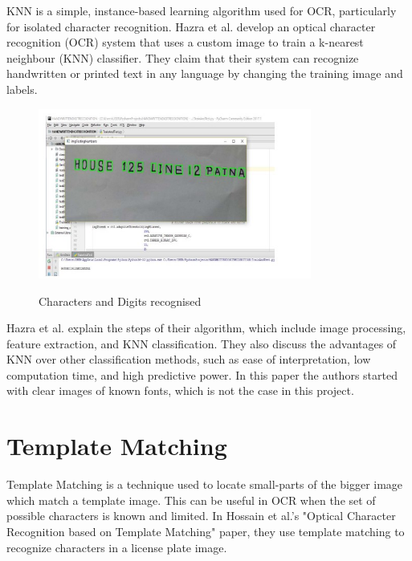 KNN is a simple, instance-based learning algorithm used for OCR, particularly for isolated character recognition. Hazra et al. develop an optical character recognition (OCR) system that uses a custom image to train a k-nearest neighbour (KNN) classifier. They claim that their system can recognize handwritten or printed text in any language by changing the training image and labels. \cite{hazraOpticalCharacterRecognition2017}

\begin{figure}[!h]
    \centering
    \includegraphics[width=0.8\textwidth]{Figures/KNN_Hazra.jpg}
    \caption[Optical Character Recognition using KNN on Custom
        Image Dataset]{Characters and Digits recognised}\cite{joshuaDevelopmentImageProcessing2023}
    \label{fig:Hazra OCR KNN Paper}
\end{figure}

Hazra et al. explain the steps of their algorithm, which include image processing, feature extraction, and KNN classification. They also discuss the advantages of KNN over other classification methods, such as ease of interpretation, low computation time, and high predictive power. In this paper the authors started with clear images of known fonts, which is not the case in this project.


\newpage

\section{Template Matching}

Template Matching is a technique used to locate small-parts of the bigger image which match a template image. This can be useful in OCR when the set of possible characters is known and limited. In Hossain et al.'s "Optical Character Recognition based on Template Matching" paper, they use template matching to recognize characters in a license plate image.

